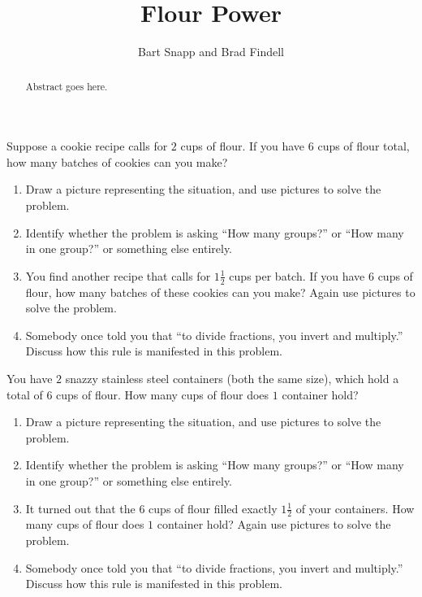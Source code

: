 \documentclass{ximera}
\title{Flour Power}
\author{Bart Snapp and Brad Findell}
\begin{document}
\begin{abstract}
Abstract goes here.  
\end{abstract}
\maketitle

\label{A:FlourPower}

\begin{problem} 
Suppose a cookie recipe calls for $2$ cups of flour. If you have $6$
cups of flour total, how many batches of cookies can you make?
\begin{enumerate}
\item Draw a picture representing the situation, and use pictures to solve the problem.
\item Identify whether the problem is asking ``How many groups?'' or ``How many in one group?'' or something else entirely.
\item You find another recipe that calls for $1\frac{1}{2}$ cups per batch. If you have $6$ cups of flour, how many batches of these cookies can you make?  Again use pictures to solve the problem.
\item Somebody once told you that ``to divide fractions, you invert and
multiply.'' Discuss how this rule is manifested in this problem.
\end{enumerate}
\end{problem}

\begin{problem} 
You have $2$ snazzy stainless steel containers (both the same size), which hold a total of
$6$ cups of flour. How many cups of flour does $1$ container hold?
\begin{enumerate}
\item Draw a picture representing the situation, and use pictures to solve the problem.
\item Identify whether the problem is asking ``How many groups?'' or ``How many in one group?'' or something else entirely.
\item It turned out that the 6 cups of flour filled exactly $1\frac{1}{2}$ of your containers.  How many cups of flour does $1$ container hold?  Again use pictures to solve the problem.
\item Somebody once told you that ``to divide fractions, you invert and
multiply.'' Discuss how this rule is manifested in this problem.
\end{enumerate}
\end{problem}
\end{document}
